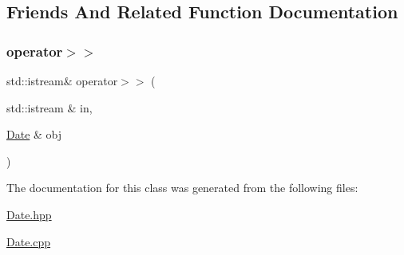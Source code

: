 \subsection{Friends And Related Function Documentation}
\mbox{\label{classDate_a025d4abf4e083a5f10d376259aac34a2}} 
\subsubsection{\texorpdfstring{operator$>$$>$}{operator>>}}
{\footnotesize\ttfamily std\+::istream\& operator$>$$>$ (\begin{DoxyParamCaption}\item[{std\+::istream \&}]{in,  }\item[{\hyperlink{classDate}{Date} \&}]{obj }\end{DoxyParamCaption})\hspace{0.3cm}{\ttfamily [friend]}}



The documentation for this class was generated from the following files\+:\begin{DoxyCompactItemize}
\item 
\hyperlink{Date_8hpp}{Date.\+hpp}\item 
\hyperlink{Date_8cpp}{Date.\+cpp}\end{DoxyCompactItemize}
